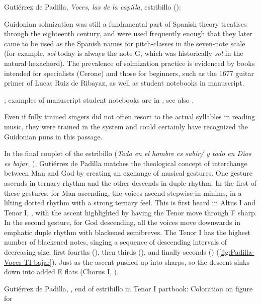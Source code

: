 {Gutiérrez de Padilla, \emph{Voces, las de la capilla}, estribillo
(): }

Guidonian solmization was still a fundamental part of Spanish theory treatises
through the eighteenth century, and were used frequently enough that they later
came to be used as the Spanish names for pitch-classes in the seven-note scale
(for example, \emph{sol} today is always the note G, which was historically
\emph{sol} in the natural hexachord).
The prevalence of solmization practice is evidenced by books intended for
specialists (Cerone) and those for beginners, such as the 1677 guitar primer of
Lucas Ruiz de Ribayaz, as well as student notebooks in manuscript.%
\begin{Footnote}
    \Autocite{Ruiz:Luz}; examples of manuscript student notebooks are in
    ; see also \autocite{Cohen:NotesMiddleAges}.
\end{Footnote}
Even if fully trained singers did not often resort to the actual syllables in
reading music, they were trained in the system and could certainly have
recognized the Guidonian puns in this passage.

In the final couplet of the estribillo (\emph{Todo en el hombre es subir/ y todo
en Dios es bajar}, ), Gutiérrez de Padilla matches the
theological concept of interchange between Man and God by creating an exchange
of musical gestures.
One gesture ascends in ternary rhythm and the other descends in duple rhythm.
In the first of these gestures, for Man ascending, the voices ascend stepwise in
minims, in a lilting dotted rhythm with a strong ternary feel.
This is first heard in Altus I and Tenor I, , with the ascent
highlighted by having the Tenor move through F sharp.
In the second gesture, for God descending, all the voices move downwards in
emphatic duple rhythm with blackened semibreves.
The Tenor I has the highest number of blackened notes, singing a sequence of
descending intervals of decreasing size: first fourths (),
then thirds (), and finally seconds ()
(\cref{fig:Padilla-Voces-TI-bajar}).
Just as the ascent pushed up into sharps, so the descent sinks down into added E
flats (Chorus I, ).

{Gutiérrez de Padilla, , end of estribillo in
Tenor I partbook: Coloration on figure for }

